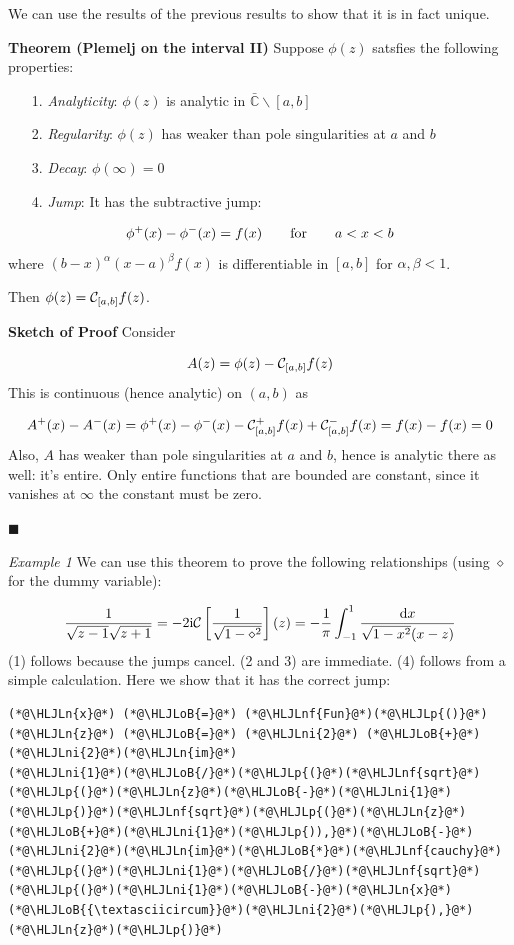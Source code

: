 \documentclass[12pt,a4paper]{article}
\newcommand{\HLJLn}[1]{#1}
\newcommand{\HLJLnf}[1]{\textcolor[RGB]{66,102,213}{#1}}
\newcommand{\HLJLni}[1]{\textcolor[RGB]{59,151,46}{#1}}
\newcommand{\HLJLoB}[1]{\textcolor[RGB]{102,102,102}{\textbf{#1}}}
\newcommand{\HLJLp}[1]{#1}
\def\qqfor{\qquad\hbox{for}\qquad}
\def\D{ {\rm d} }
\def\I{ {\rm i} }
\def\C{ {\mathbb C} }
\def\qqfor{\qquad\hbox{for}\qquad}
\def\dx{\D x}
\begin{document}
We can use the results of the previous results to show that it is in fact unique.

\textbf{Theorem (Plemelj on the interval II)} Suppose $\phi(z)$ satsfies the following properties:

\begin{itemize}
\item[1. ] \emph{Analyticity}: $\phi(z)$ is analytic in $\bar \C \backslash [a,b]$


\item[2. ] \emph{Regularity}: $\phi(z)$ has weaker than pole singularities at $a$ and $b$


\item[3. ] \emph{Decay}: $\phi(\infty) = 0$


\item[4. ] \emph{Jump}: It has the subtractive jump:

\end{itemize}
\[
\phi^+(x) - \phi^-(x) = f(x) \qqfor a < x < b
\]
where $(b-x)^\alpha (x-a)^\beta f(x)$ is differentiable in $[a,b]$ for $\alpha,\beta < 1$.  

Then $\phi(z) = {\cal C}_{[a,b]} f(z)$.

\textbf{Sketch of Proof} Consider 

\[
A(z) = \phi(z) - {\cal C}_{[a,b]} f(z)
\]
This is continuous (hence analytic) on $(a,b)$ as

\[
A^+(x) - A^-(x) = \phi^+(x) -\phi^-(x) - {\cal C}_{[a,b]}^+ f(x) + {\cal C}_{[a,b]}^- f(x)  =f(x) - f(x) = 0
\]
Also, $A$ has weaker than pole singularities at $a$ and $b$, hence is analytic there as well: it's entire.  Only entire functions that are bounded are constant, since it vanishes at $\infty$ the constant must be zero.

\ensuremath{\blacksquare}

\emph{Example 1} We can use this theorem to prove the following relationships  (using $\diamond$ for the dummy variable):

\[
{1 \over \sqrt{z-1} \sqrt{z+1}} = -2 \I {\cal C}\left[{1 \over \sqrt{1-\diamond^2}}\right](z) = 
-{1 \over \pi}\int_{-1}^1 {\dx \over \sqrt{1-x^2} (x-z)}
\]
(1) follows because the jumps cancel. (2 and 3) are immediate. (4) follows from a simple calculation.  Here we show that it has the correct jump:


\begin{lstlisting}
(*@\HLJLn{x}@*) (*@\HLJLoB{=}@*) (*@\HLJLnf{Fun}@*)(*@\HLJLp{()}@*)
(*@\HLJLn{z}@*) (*@\HLJLoB{=}@*) (*@\HLJLni{2}@*) (*@\HLJLoB{+}@*)(*@\HLJLni{2}@*)(*@\HLJLn{im}@*)
(*@\HLJLni{1}@*)(*@\HLJLoB{/}@*)(*@\HLJLp{(}@*)(*@\HLJLnf{sqrt}@*)(*@\HLJLp{(}@*)(*@\HLJLn{z}@*)(*@\HLJLoB{-}@*)(*@\HLJLni{1}@*)(*@\HLJLp{)}@*)(*@\HLJLnf{sqrt}@*)(*@\HLJLp{(}@*)(*@\HLJLn{z}@*)(*@\HLJLoB{+}@*)(*@\HLJLni{1}@*)(*@\HLJLp{)),}@*)(*@\HLJLoB{-}@*)(*@\HLJLni{2}@*)(*@\HLJLn{im}@*)(*@\HLJLoB{*}@*)(*@\HLJLnf{cauchy}@*)(*@\HLJLp{(}@*)(*@\HLJLni{1}@*)(*@\HLJLoB{/}@*)(*@\HLJLnf{sqrt}@*)(*@\HLJLp{(}@*)(*@\HLJLni{1}@*)(*@\HLJLoB{-}@*)(*@\HLJLn{x}@*)(*@\HLJLoB{{\textasciicircum}}@*)(*@\HLJLni{2}@*)(*@\HLJLp{),}@*)(*@\HLJLn{z}@*)(*@\HLJLp{)}@*)
\end{lstlisting}
\end{document}
